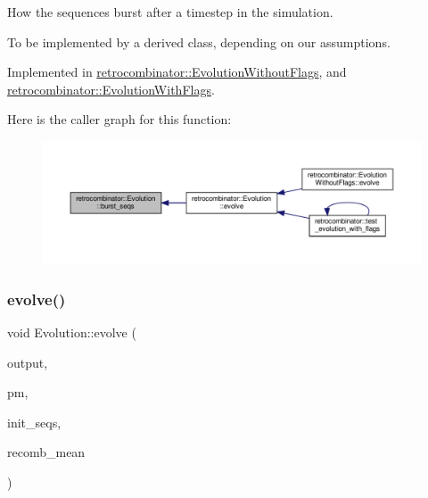 How the sequences burst after a timestep in the simulation. 

To be implemented by a derived class, depending on our assumptions. 

Implemented in \hyperlink{classretrocombinator_1_1EvolutionWithoutFlags_aeba3cc75049e0590e5dcaab9558f8c56}{retrocombinator\+::\+Evolution\+Without\+Flags}, and \hyperlink{classretrocombinator_1_1EvolutionWithFlags_abad180fa8494b259e5167a13285347dd}{retrocombinator\+::\+Evolution\+With\+Flags}.

Here is the caller graph for this function\+:
\nopagebreak
\begin{figure}[H]
\begin{center}
\leavevmode
\includegraphics[width=350pt]{classretrocombinator_1_1Evolution_abab94a3f14460300a6a3b7a0286236a6_icgraph}
\end{center}
\end{figure}
\mbox{\label{classretrocombinator_1_1Evolution_a0b8a181242ea8ee3072258fa7ed416f4}} 
\subsubsection{\texorpdfstring{evolve()}{evolve()}}
{\footnotesize\ttfamily void Evolution\+::evolve (\begin{DoxyParamCaption}\item[{\hyperlink{classretrocombinator_1_1Output}{Output} \&}]{output,  }\item[{\hyperlink{classretrocombinator_1_1PointMutator}{Point\+Mutator} \&}]{pm,  }\item[{const std\+::vector$<$ std\+::string $>$ \&}]{init\+\_\+seqs,  }\item[{double}]{recomb\+\_\+mean }\end{DoxyParamCaption})\hspace{0.3cm}{\ttfamily [virtual]}}



